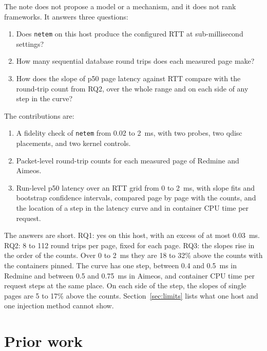 \documentclass[11pt]{article}
\begin{document}
The note does not propose a model or a mechanism, and it does not rank frameworks. It answers
three questions:

\begin{enumerate}
  \item[RQ1] Does \texttt{netem} on this host produce the configured RTT at sub-millisecond
    settings?
  \item[RQ2] How many sequential database round trips does each measured page make?
  \item[RQ3] How does the slope of p50 page latency against RTT compare with the round-trip
    count from RQ2, over the whole range and on each side of any step in the curve?
\end{enumerate}

The contributions are:
\begin{enumerate}
  \item A fidelity check of \texttt{netem} from 0.02 to 2~ms, with two probes, two qdisc
    placements, and two kernel controls.
  \item Packet-level round-trip counts for each measured page of Redmine and Aimeos.
  \item Run-level p50 latency over an RTT grid from 0 to 2~ms, with slope fits and bootstrap
    confidence intervals, compared page by page with the counts, and the location of a step
    in the latency curve and in container CPU time per request.
\end{enumerate}

The answers are short. RQ1: yes on this host, with an excess of at most 0.03~ms. RQ2: 8 to
112 round trips per page, fixed for each page. RQ3: the slopes rise in the order of the
counts. Over 0 to 2~ms they are 18 to 32\% above the counts with the containers pinned. The
curve has one step, between 0.4 and 0.5~ms in Redmine and between 0.5 and 0.75~ms in Aimeos,
and container CPU time per request steps at the same place. On each side of the step, the
slopes of single pages are 5 to 17\% above the counts. Section~\ref{sec:limits} lists what
one host and one injection method cannot show.

\section{Prior work}
\end{document}
